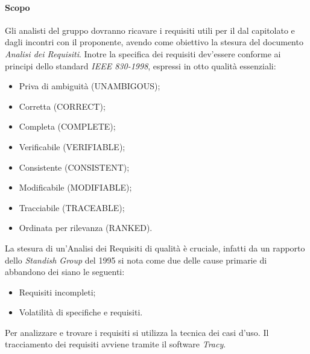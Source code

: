 			\paragraph*{Scopo}
				Gli analisti del gruppo dovranno ricavare i requisiti utili per il 
				dal capitolato e dagli incontri con il proponente, avendo come obiettivo la
				stesura del documento \textit{Analisi dei Requisiti}.
			        Inotre la specifica dei requisiti dev'essere conforme ai principi dello standard \textit{IEEE 830-1998}, espressi in otto qualit\`a
			        essenziali:
				\begin{itemize}
				\item Priva di ambiguit\`a (UNAMBIGOUS);
				\item Corretta (CORRECT);
				\item Completa (COMPLETE);
				\item Verificabile (VERIFIABLE);
				\item Consistente (CONSISTENT);
				\item Modificabile (MODIFIABLE);
				\item Tracciabile (TRACEABLE);
				\item Ordinata per rilevanza (RANKED).
				\end{itemize}
			        La stesura di un'Analisi dei Requisiti di qualit\`a \`e cruciale, infatti
			        da un rapporto dello \textit{Standish Group} del 1995 si nota come due delle cause primarie
			        di abbandono dei  siano le seguenti:
				\begin{itemize}
				\item Requisiti incompleti;
				\item Volatilità di specifiche e requisiti.
				\end{itemize}
				Per analizzare e trovare i requisiti si utilizza la tecnica dei casi d’uso. Il tracciamento dei requisiti avviene 
			        tramite il software \textit{Tracy}.
			
